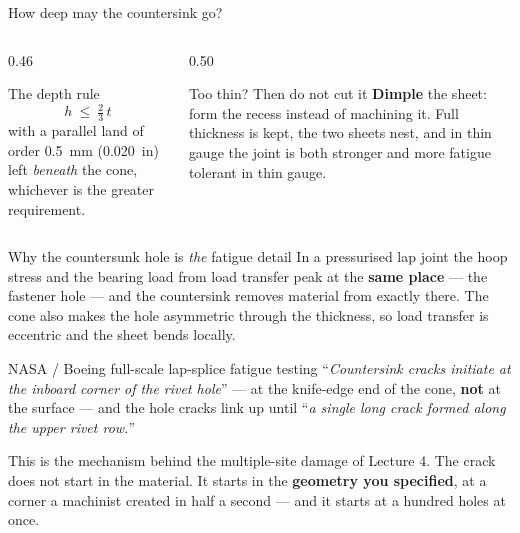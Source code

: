 \documentclass[aspectratio=169,10pt]{beamer}
\begin{document}
\begin{frame}{How deep may the countersink go?}
\centering
\resizebox{!}{3.5cm}{}
\vfill
\raggedright
\begin{columns}[T]
\begin{column}{0.46\textwidth}
\begin{block}{The depth rule}
\[ h \ \le\ \tfrac{2}{3}\,t \]
with a parallel land of order \SI{0.5}{mm} (\SI{0.020}{in}) left \emph{beneath} the cone, whichever
is the greater requirement.
\end{block}
\end{column}
\begin{column}{0.50\textwidth}
\begin{alertblock}{Too thin? Then do not cut it}
\textbf{Dimple} the sheet: form the recess instead of machining it. Full thickness is kept, the two
sheets nest, and in thin gauge the joint is both stronger and more fatigue tolerant in thin gauge.
\end{alertblock}
\end{column}
\end{columns}
\end{frame}

\begin{frame}{Why the countersunk hole is \emph{the} fatigue detail}
In a pressurised lap joint the hoop stress and the bearing load from load transfer peak at the
\textbf{same place} --- the fastener hole --- and the countersink removes material from exactly there.
The cone also makes the hole asymmetric through the thickness, so load transfer is eccentric and the
sheet bends locally.
\vfill
\begin{alertblock}{NASA / Boeing full-scale lap-splice fatigue testing}
``\emph{Countersink cracks initiate at the inboard corner of the rivet hole}'' --- at the knife-edge
end of the cone, \textbf{not} at the surface --- and the hole cracks link up until
``\emph{a single long crack formed along the upper rivet row.}''
\end{alertblock}
\vfill
This is the mechanism behind the multiple-site damage of Lecture 4. The crack does not start in the
material. It starts in the \textbf{geometry you specified}, at a corner a machinist created in half a
second --- and it starts at a hundred holes at once.
\end{frame}
\end{document}
